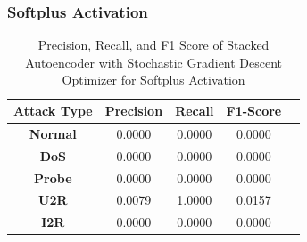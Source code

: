 \documentclass[12pt, a4paper]{report}
\begin{document}
\subsubsection{Softplus Activation}
\begin{table}[ht]
\centering
\captionsetup{justification=centering,margin=2cm}
\begin{tabular}{|c|c|c|c|c|}
\hline
\multicolumn{1}{|c|}{\textbf{Attack Type}} & \multicolumn{1}{c|}{\textbf{Precision}} & \multicolumn{1}{c|}{\textbf{Recall}} & \multicolumn{1}{c|}{\textbf{F1-Score}} \\ \hline
\textbf{Normal}        & 0.0000                                   & 0.0000                                & 0.0000                                                                  \\ \hline
\textbf{DoS}           & 0.0000                                  & 0.0000                                &  0.0000                                                                    \\ \hline
\textbf{Probe}         & 0.0000                                  & 0.0000                                & 0.0000                                                                  \\ \hline
\textbf{U2R}           & 0.0079                                    & 1.0000                                & 0.0157                                                                   \\ \hline
\textbf{I2R}           & 0.0000                                      & 0.0000                                   & 0.0000                                                            \\ \hline         \end{tabular}
\caption{Precision, Recall, and F1 Score of Stacked Autoencoder with Stochastic Gradient Descent Optimizer for Softplus Activation}
\label{prf1_rmsprop_elu_auto}
\end{table}

\clearpage
\end{document}
